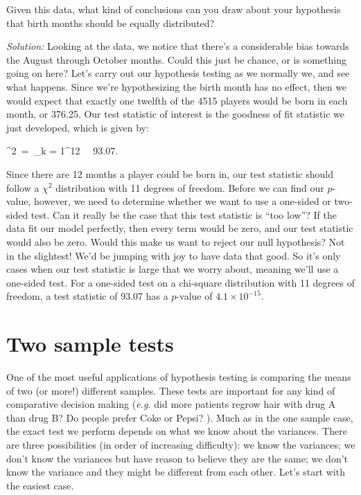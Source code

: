 Given this data, what kind of conclusions can you draw about your hypothesis that birth months should be equally distributed?



\emph{Solution:}  Looking at the data, we notice that there's a considerable bias towards the August through October months.  Could this just be chance, or is something going on here? Let's carry out our hypothesis testing as we normally we, and see what happens.  Since we're hypothesizing the birth month has no effect, then we would expect that exactly one twelfth of the 4515 players would be born in each month, or 376.25.  Our test statistic of interest is the goodness of fit statistic we just developed, which is given by:



\bel

\chi^2\ =\ \sum_{k = 1}^{12} \ \approx \  93.07.

\eel

Since there are 12 months a player could be born in, our test statistic should follow a $\chi^2$ distribution with 11 degrees of freedom.  Before we can find our $p$-value, however, we need to determine whether we want to use a one-sided or two-sided test.  Can it really be the case that this test statistic is ``too low''?  If the data fit our model perfectly, then every term would be zero, and our test statistic would also be zero.  Would this make us want to reject our null hypothesis?  Not in the slightest!  We'd be jumping with joy to have data that good.  So it's only cases when our test statistic is large that we worry about, meaning we'll use a one-sided test.  For a one-sided test on a chi-square distribution with 11 degrees of freedom, a test statistic of 93.07 has a $p$-value of $4.1 \times 10^{-15}$.










\section{Two sample tests} \label{sec: Twosampletests}



One of the most useful applications of hypothesis testing is comparing the means of two (or more!) different samples.  These tests are important for any kind of comparative decision making (\emph{e.g.} did more patients regrow hair with drug A than drug B?  Do people prefer Coke or Pepsi? ).  Much as in the one sample case, the exact test we perform depends on what we know about the variances.  There are three possibilities (in order of increasing difficulty):  we know the variances; we don't know the variances but have reason to believe they are the same; we don't know the variance and they might be different from each other.  Let's start with the easiest case.





